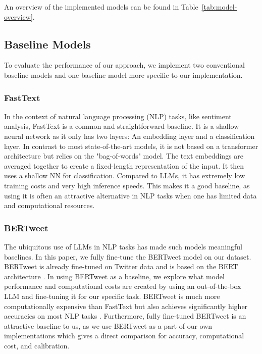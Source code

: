 \documentclass[10pt,conference,compsocconf]{IEEEtran}
\begin{document}
An overview of the implemented models can be found in Table~\ref{tab:model-overview}.

\subsection{Baseline Models}
To evaluate the performance of our approach, we implement two conventional baseline models and one baseline model more specific to our implementation.

\subsubsection{FastText}
In the context of natural language processing (NLP) tasks, like sentiment analysis, FastText \cite{bojanowski2017fasttext} is a common and straightforward baseline. It is a shallow neural network as it only has two layers: An embedding layer and a classification layer. In contrast to most state-of-the-art models, it is not based on a transformer architecture but relies on the "bag-of-words" model. The text embeddings are averaged together to create a fixed-length representation of the input. It then uses a shallow NN for classification. Compared to LLMs, it has extremely low training costs and very high inference speeds. This makes it a good baseline, as using it is often an attractive alternative in NLP tasks when one has limited data and computational resources.

\subsubsection{BERTweet}
The ubiquitous use of LLMs in NLP tasks has made such models meaningful baselines. In this paper, we fully fine-tune the BERTweet model \cite{nguyen2020bertweet} on our dataset. BERTweet is already fine-tuned on Twitter data and is based on the BERT architecture \cite{devlin2018bert}. In using BERTweet as a baseline, we explore what model performance and computational costs are created by using an out-of-the-box LLM and fine-tuning it for our specific task. BERTweet is much more computationally expensive than FastText but also achieves significantly higher accuracies on most NLP tasks \cite{nguyen2020bertweet}. Furthermore, fully fine-tuned BERTweet is an attractive baseline to us, as we use BERTweet as a part of our own implementations which gives a direct comparison for accuracy, computational cost, and calibration.
\end{document}
